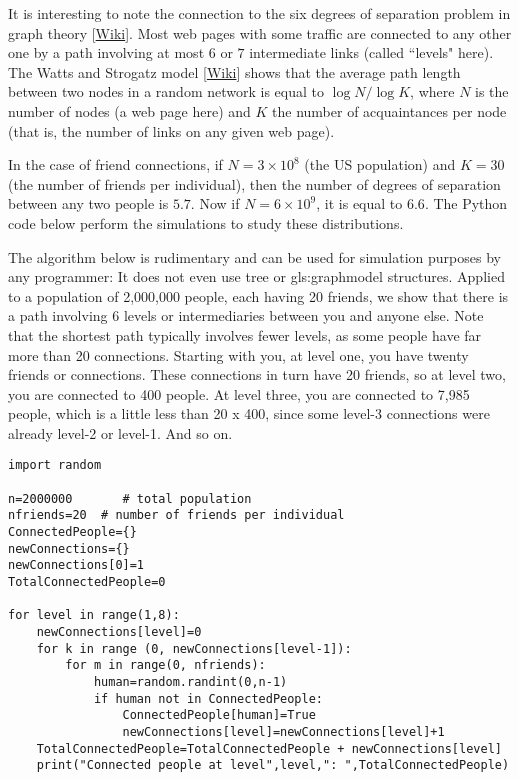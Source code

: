 \documentclass[oneside,10pt]{book}
\begin{document}
It is interesting to note the connection to the \textcolor{index}{six degrees of separation} problem in graph theory [\href{https://en.wikipedia.org/wiki/Six_degrees_of_separation}{Wiki}].  Most web pages with some traffic are connected to any other one by a path involving at most $6$ or $7$ intermediate links (called ``levels" here).
The \textcolor{index}{Watts and Strogatz model} [\href{https://en.wikipedia.org/wiki/Watts\%E2\%80\%93Strogatz_model}{Wiki}] shows that the average path length between two nodes in a random network is equal to $\log N / \log K$, where $N$ is the number of
 nodes (a web page here) and $K$ the number  of acquaintances per node (that is, the number of links on any given web page). 

In the case of friend connections, if $N = 3\times 10^8$ (the US population) and $K = 30$ (the number of friends per individual), then  the 
number of degrees of separation between any two people is $5.7$. Now if $N = 6\times 10^9$, it is equal to $6.6$. The Python code below perform the simulations to study these distributions.

The algorithm below is rudimentary and can be used for simulation purposes by any programmer: It does not even use tree or \gls{gls:graphmodel} structures.  Applied to a population of 2,000,000 people, each having 20 friends, we show that there is a path involving 6 levels or intermediaries between you and anyone else. Note that the shortest path typically involves fewer levels, as some people have far more than 20 connections. 
Starting with you, at level one, you have twenty friends or connections. These connections in turn have 20 friends, so at level two, you are connected to 400 people. At level three, you are connected to 7,985 people, which is a little less than 20 x 400, since some level-3 connections were already level-2 or level-1. And so on. \\


\begin{lstlisting}
import random

n=2000000       # total population
nfriends=20  # number of friends per individual
ConnectedPeople={}
newConnections={}
newConnections[0]=1 
TotalConnectedPeople=0

for level in range(1,8): 
    newConnections[level]=0
    for k in range (0, newConnections[level-1]): 
        for m in range(0, nfriends): 
            human=random.randint(0,n-1) 
            if human not in ConnectedPeople:
                ConnectedPeople[human]=True 
                newConnections[level]=newConnections[level]+1
    TotalConnectedPeople=TotalConnectedPeople + newConnections[level]
    print("Connected people at level",level,": ",TotalConnectedPeople)
\end{lstlisting}
\end{document}
